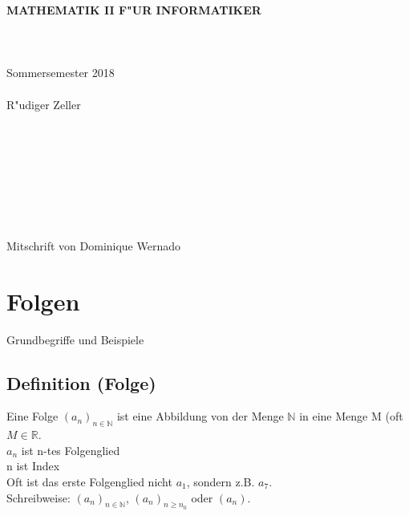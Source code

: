 \documentclass[12pt,a4paper]{article}
\begin{document}
\begin{titlepage}
\begin{center}
{\Huge \textbf{MATHEMATIK II F"UR INFORMATIKER}}\\
~\\
~\\
~\\
{\huge Sommersemester 2018 \\
~\\
R"udiger Zeller}\\
~\\
~\\
~\\
~\\
~\\
~\\
~\\
~\\
{\small Mitschrift von Dominique Wernado}
\end{center}
\end{titlepage}
\tableofcontents
\newpage


\section{Folgen}
Grundbegriffe und Beispiele
\subsection{Definition (Folge)}
Eine Folge $(a_n)_{n \in \mathbb{N}}$ ist eine Abbildung von der Menge $\mathbb{N}$ in eine Menge M (oft $M \in \mathbb{R}$. \\
$a_n$ ist n-tes Folgenglied \\
n ist Index \\
Oft ist das erste Folgenglied nicht $a_1$, sondern z.B. $a_7$. \\
Schreibweise: $(a_n)_{n \in \mathbb{N}}$, $(a_n)_{n \geq n_0}$ oder $(a_n)$.
\end{document}
